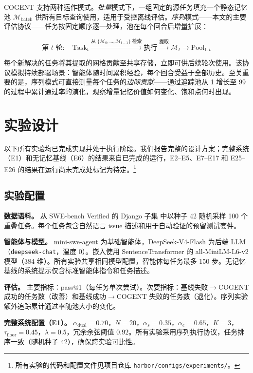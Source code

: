 \documentclass[UTF8,twocolumn]{ctexart}
\begin{document}
\textsc{COGENT} 支持两种运作模式。\emph{批量}模式下，一组固定的源任务填充一个静态记忆池 $\mathcal{M}_{\text{batch}}$ 供所有目标查询使用，适用于受控离线评估。\emph{序列}模式——本文的主要评估协议——任务按固定顺序逐一处理，池在每个回合后增量扩展：

\begin{equation}
    \text{第 } t \text{ 轮}: \quad \text{Task}_t \xrightarrow{\text{从 } \{\mathcal{M}_0, \ldots, \mathcal{M}_{t-1}\} \text{ 检索}} \text{执行} \xrightarrow{\text{提取}} \mathcal{M}_t \rightarrow \text{Pool}_{1:t}
\end{equation}

每个新解决的任务将其提取的网格贡献至共享存储，立即可供后续轮次使用。该协议模拟持续部署场景：智能体随时间累积经验，每个回合受益于全部历史。至关重要的是，序列模式可直接测量每个任务的\emph{边际贡献}——通过追踪池从 1 增长至 99 的过程中累计通过率的演化，观察增量记忆价值如何变化、饱和点何时出现。

\section{实验设计}

以下所有实验均已完成实现并处于执行阶段。我们报告完整的设计方案；完整系统（E1）和无记忆基线（E6）的结果来自已完成的运行，E2--E5、E7--E17 和 E25--E26 的结果在运行尚未完成处标记为待定。\footnote{所有实验的代码和配置文件见项目仓库 \texttt{harbor/configs/experiments/}。}

\subsection{实验配置}

\textbf{数据语料。} 从 SWE-bench Verified 的 Django 子集 \cite{swe-bench} 中以种子 42 随机采样 100 个重叠任务。每个任务包含自然语言 issue 描述和用于自动验证的预留测试套件。

\textbf{智能体与模型。} mini-swe-agent 为基础智能体，DeepSeek-V4-Flash 为后端 LLM（\texttt{deepseek-chat}，温度 0）。嵌入使用 SentenceTransformer 的 all-MiniLM-L6-v2 模型（384 维）。所有实验共享相同模型配置，智能体每任务最多 150 步。无记忆基线的系统提示仅含标准智能体指令和任务描述。

\textbf{评估。} 主要指标：pass@1（每任务单次尝试）。次要指标：基线失败$\rightarrow$COGENT 成功的任务数（改善）和基线成功$\rightarrow$COGENT 失败的任务数（退化）。序列实验额外追踪累计通过率随池大小的变化。

\textbf{完整系统配置（E1）。} $\alpha_{\text{dual}} = 0.70$，$N = 20$，$\alpha_s = 0.35$，$\alpha_c = 0.65$，$K = 3$，$\tau_{\text{floor}} = 0.45$，$\lambda = 0.5$，冗余余弦阈值 $0.92$。所有实验采用序列执行协议，任务排序一致（随机种子 42），确保跨实验可比性。
\end{document}
